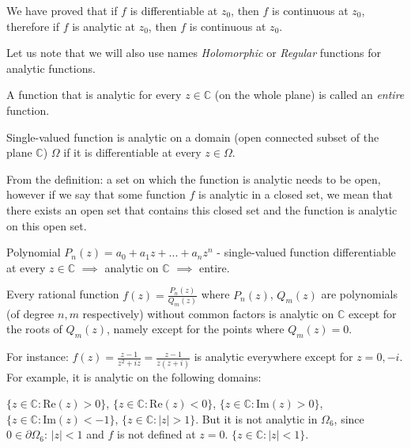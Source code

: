 \documentclass[12pt]{article}
\newcommand{\Rea}{\text{Re}}
\newcommand{\Ima}{\text{Im}}
\begin{document}
We have proved that if $f$ is differentiable at $z_0$, then $f$ is continuous at $z_0$, therefore if $f$ is analytic at $z_0$, then $f$ is continuous at $z_0$.

Let us note that we will also use names \emph{Holomorphic} or \emph{Regular} functions for analytic functions.

\begin{definition}
A function that is analytic for every $z \in \mathbb{C}$ (on the whole plane) is called an \emph{entire} function.
\end{definition}

\begin{definition}
Single-valued function is analytic on a domain (open connected subset of the plane $\mathbb{C}$) $\Omega$ if it is differentiable at every $z \in \Omega$.
\end{definition}

\begin{remark}
From the definition: a set on which the function is analytic needs to be open, however if we say that some function $f$ is analytic in a closed set, we mean that there exists an open set that contains this closed set and the function is analytic on this open set.
\end{remark}

\begin{example}
Polynomial $P_n(z) = a_0 + a_1z + ... + a_nz^n$ - single-valued function differentiable at every $z \in \mathbb{C}$ $\implies$ analytic on $\mathbb{C}$ $\implies$ entire.
\end{example}

\begin{example}
Every rational function $f(z) = \frac{P_n(z)}{Q_m(z)}$ where $P_n(z)$, $Q_m(z)$ are polynomials (of degree $n, m$ respectively) without common factors is analytic on $\mathbb{C}$ except for the roots of $Q_m(z)$, namely except for the points where $Q_m(z) = 0$.

For instance: $f(z) = \frac{z-1}{z^2+iz} = \frac{z-1}{z(z+i)}$ is analytic everywhere except for $z=0, -i$. For example, it is analytic on the following domains:
\end{example}
$\{z \in \mathbb{C}: \Rea(z) > 0\}$, $\{z \in \mathbb{C}: \Rea(z) < 0\}$, $\{z \in \mathbb{C}: \Ima(z) > 0\}$, $\{z \in \mathbb{C}: \Ima(z) < -1\}$, $\{z \in \mathbb{C}: |z| > 1\}$. But it is not analytic in $\Omega_6$, since $0 \in \partial \Omega_6$: $|z|<1$ and $f$ is not defined at $z=0$. $\{z \in \mathbb{C}: |z|<1\}$.
\end{document}

